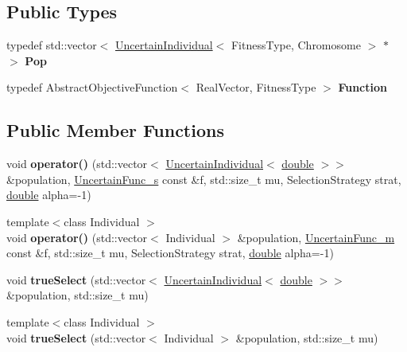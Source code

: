 \subsection*{Public Types}
\begin{DoxyCompactItemize}
\item 
typedef std\+::vector$<$ \hyperlink{classUncertainIndividual}{Uncertain\+Individual}$<$ Fitness\+Type, Chromosome $>$ $\ast$ $>$ {\bfseries Pop}\hypertarget{classUncertainSelection_a0520542236adabbd15036921601b2116}{}\label{classUncertainSelection_a0520542236adabbd15036921601b2116}

\item 
typedef Abstract\+Objective\+Function$<$ Real\+Vector, Fitness\+Type $>$ {\bfseries Function}\hypertarget{classUncertainSelection_af18b3ce54c2dfeb33513b2aa411a1050}{}\label{classUncertainSelection_af18b3ce54c2dfeb33513b2aa411a1050}

\end{DoxyCompactItemize}
\subsection*{Public Member Functions}
\begin{DoxyCompactItemize}
\item 
void {\bfseries operator()} (std\+::vector$<$ \hyperlink{classUncertainIndividual}{Uncertain\+Individual}$<$ \hyperlink{classdouble}{double} $>$$>$ \&population, \hyperlink{classUncertainFunc__s}{Uncertain\+Func\+\_\+s} const \&f, std\+::size\+\_\+t mu, Selection\+Strategy strat, \hyperlink{classdouble}{double} alpha=-\/1)\hypertarget{classUncertainSelection_a817c2095dbd2d59897e5412a86ab6ffe}{}\label{classUncertainSelection_a817c2095dbd2d59897e5412a86ab6ffe}

\item 
{\footnotesize template$<$class Individual $>$ }\\void {\bfseries operator()} (std\+::vector$<$ Individual $>$ \&population, \hyperlink{classUncertainFunc__m}{Uncertain\+Func\+\_\+m} const \&f, std\+::size\+\_\+t mu, Selection\+Strategy strat, \hyperlink{classdouble}{double} alpha=-\/1)\hypertarget{classUncertainSelection_a8a76bfed7c8184d9e4eeb5a1352e2b94}{}\label{classUncertainSelection_a8a76bfed7c8184d9e4eeb5a1352e2b94}

\item 
void {\bfseries true\+Select} (std\+::vector$<$ \hyperlink{classUncertainIndividual}{Uncertain\+Individual}$<$ \hyperlink{classdouble}{double} $>$$>$ \&population, std\+::size\+\_\+t mu)\hypertarget{classUncertainSelection_a4d239f710aa2347779b9ab3f531a8918}{}\label{classUncertainSelection_a4d239f710aa2347779b9ab3f531a8918}

\item 
{\footnotesize template$<$class Individual $>$ }\\void {\bfseries true\+Select} (std\+::vector$<$ Individual $>$ \&population, std\+::size\+\_\+t mu)\hypertarget{classUncertainSelection_a3d5b16c3dbaaa1d441ee83a156906735}{}\label{classUncertainSelection_a3d5b16c3dbaaa1d441ee83a156906735}

\end{DoxyCompactItemize}
